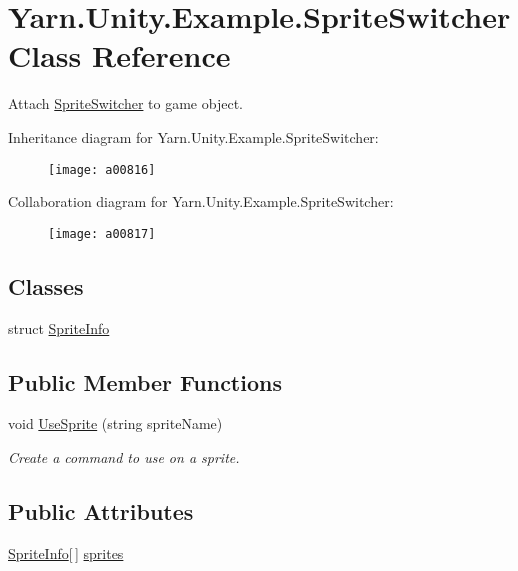 \hypertarget{a00165}{\section{Yarn.\-Unity.\-Example.\-Sprite\-Switcher Class Reference}
\label{a00165}
}


Attach \hyperlink{a00165}{Sprite\-Switcher} to game object.  




Inheritance diagram for Yarn.\-Unity.\-Example.\-Sprite\-Switcher\-:
\nopagebreak
\begin{figure}[H]
\begin{center}
\leavevmode
\texttt{[image: a00816]}
\end{center}
\end{figure}


Collaboration diagram for Yarn.\-Unity.\-Example.\-Sprite\-Switcher\-:
\nopagebreak
\begin{figure}[H]
\begin{center}
\leavevmode
\texttt{[image: a00817]}
\end{center}
\end{figure}
\subsection*{Classes}
\begin{DoxyCompactItemize}
\item 
struct \hyperlink{a00165_a00385}{Sprite\-Info}
\end{DoxyCompactItemize}
\subsection*{Public Member Functions}
\begin{DoxyCompactItemize}
\item 
void \hyperlink{a00165_ac26718b713f342f3de8f3e569c5b62da}{Use\-Sprite} (string sprite\-Name)
\begin{DoxyCompactList}\small\item\em Create a command to use on a sprite. \end{DoxyCompactList}\end{DoxyCompactItemize}
\subsection*{Public Attributes}
\begin{DoxyCompactItemize}
\item 
\hyperlink{a00165_a00385}{Sprite\-Info}\mbox{[}$\,$\mbox{]} \hyperlink{a00165_a1e85d9f4f6b33ca7ae638cce2eb704aa}{sprites}
\end{DoxyCompactItemize}


